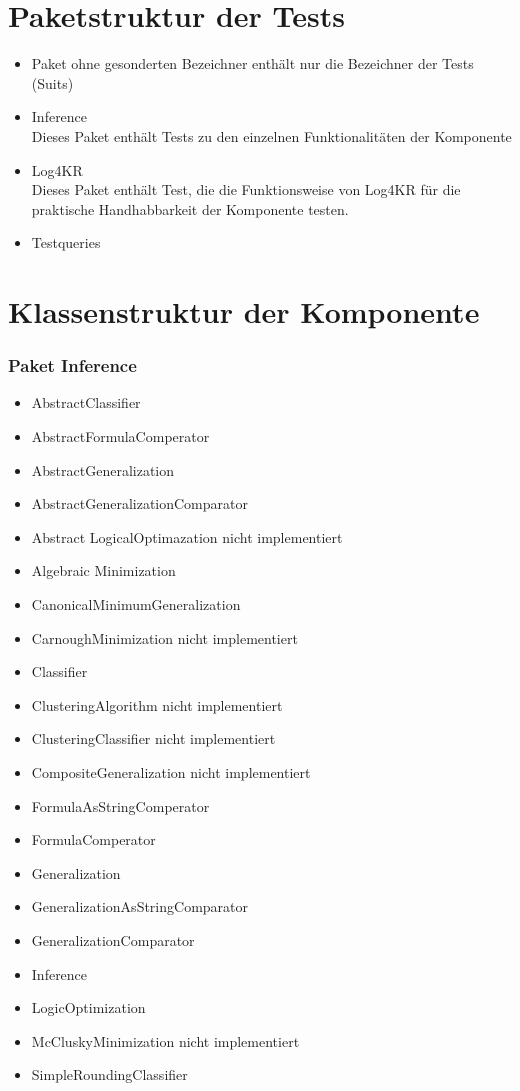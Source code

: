 \documentclass[a4paper, 11pt]{book}
\begin{document}
{\section{Paketstruktur der Tests}
\begin{itemize}
	\item{Paket ohne gesonderten Bezeichner}
	enthält nur die Bezeichner der Tests (Suits)
	\item{Inference}\\
	Dieses Paket enthält Tests zu den einzelnen Funktionalitäten der Komponente
	\item{Log4KR}\\
	Dieses Paket enthält Test, die die Funktionsweise von Log4KR für die praktische Handhabbarkeit der Komponente testen.
	\item{Testqueries}
\end{itemize}

\section{Klassenstruktur der Komponente}
\subsubsection{Paket Inference}
\begin{itemize}
	\item AbstractClassifier
	\item AbstractFormulaComperator
	\item AbstractGeneralization
	\item AbstractGeneralizationComparator
	\item Abstract LogicalOptimazation nicht implementiert
	\item Algebraic Minimization
	\item CanonicalMinimumGeneralization
	\item CarnoughMinimization nicht implementiert
	\item Classifier
	\item ClusteringAlgorithm nicht implementiert
	\item ClusteringClassifier nicht implementiert
	\item CompositeGeneralization nicht implementiert
	\item FormulaAsStringComperator
	\item FormulaComperator
	\item Generalization
	\item GeneralizationAsStringComparator
	\item GeneralizationComparator
	\item Inference
	\item LogicOptimization
	\item McCluskyMinimization nicht implementiert
	\item SimpleRoundingClassifier
\end{itemize}
}
\end{document}
